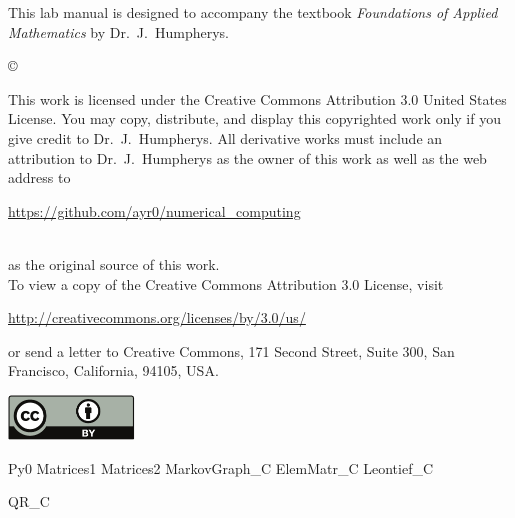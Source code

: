 \documentclass{newsiambook}
\begin{document}
\begin{thepreface}
This lab manual is designed to accompany the textbook \emph{Foundations of Applied Mathematics} by Dr.~J.~Humpherys.

\vfill
\copyright{This work is licensed under the Creative Commons Attribution 3.0 United States 
License.  You may copy, distribute, and display this copyrighted work only if you give 
credit to Dr.~J.~Humpherys. All derivative works must include an attribution to Dr.~J.~Humpherys as the owner of this work as well as the web address to 
\\\centerline{\url{https://github.com/ayr0/numerical_computing}}\\ as the original source of 
this 
work.\\To view a copy of the Creative Commons Attribution 3.0 License, 
visit\\\centerline{\url{http://creativecommons.org/licenses/by/3.0/us/}} or send a letter to 
Creative Commons, 171 Second Street, Suite 300, San Francisco, California, 94105, USA.}

\vfill
\centering\includegraphics[height=1.2cm]{by}
\vfill
\end{thepreface}

\setcounter{tocdepth}{1}
\tableofcontents

\mainmatter


{Py0}
{Matrices1}
{Matrices2}
{MarkovGraph_C}
{ElemMatr_C}
{Leontief_C}

{QR_C}


\end{document}
